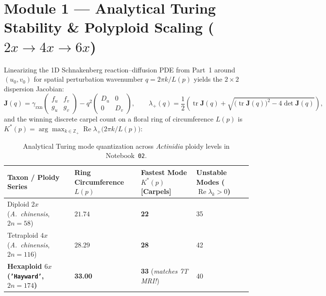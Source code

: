 \documentclass[10.5pt,a4paper]{article}
\begin{document}
\section{Module 1 --- Analytical Turing Stability \& Polyploid Scaling ($2x \to 4x \to 6x$)}
\label{sec:turing-ploidy}

Linearizing the 1D Schnakenberg reaction--diffusion PDE from Part~1 around $(u_0, v_0)$ for spatial perturbation wavenumber $q = 2\pi k / L(p)$ yields the $2\times 2$ dispersion Jacobian:
\begin{equation}
    \mathbf{J}(q) = \gamma_{\text{rxn}}\begin{pmatrix} f_u & f_v \\ g_u & g_v \end{pmatrix} - q^2\begin{pmatrix} D_u & 0 \\ 0 & D_v \end{pmatrix}, \qquad \lambda_+(q) = \frac{1}{2}\!\left(\operatorname{tr}\mathbf{J}(q) + \sqrt{\big(\operatorname{tr}\mathbf{J}(q)\big)^2 - 4\det\mathbf{J}(q)}\right),
\end{equation}
and the winning discrete carpel count on a floral ring of circumference $L(p)$ is $K^*(p) = \arg\max_{k \in \mathbb{Z}_+} \operatorname{Re}\lambda_+\!\big(2\pi k / L(p)\big)$:

\begin{table}[H]
\centering
\scriptsize
\renewcommand{\arraystretch}{1.18}
\begin{tabularx}{\textwidth}{Y C{3.0cm} C{3.0cm} C{3.2cm}}
\toprule
{}
\textbf{Taxon / Ploidy Series} & \textbf{Ring Circumference $L(p)$} & \textbf{Fastest Mode $K^*(p)$ [Carpels]} & \textbf{Unstable Modes ($\operatorname{Re}\lambda_k > 0$)} \\
\midrule
Diploid $2x$ (\emph{A.\ chinensis}, $2n=58$) & $21.74$ & \textbf{22} & 35 \\
Tetraploid $4x$ (\emph{A.\ chinensis}, $2n=116$) & $28.29$ & \textbf{28} & 42 \\
\textbf{Hexaploid $6x$ (\texttt{'Hayward'}, $2n=174$)} & \textbf{33.00} & \textbf{33} (\emph{matches 7T MRI!}) & 40 \\
\bottomrule
\end{tabularx}
\caption{Analytical Turing mode quantization across \emph{Actinidia} ploidy levels in Notebook~\texttt{02}.}
\label{tab:ploidy}
\end{table}
\end{document}
